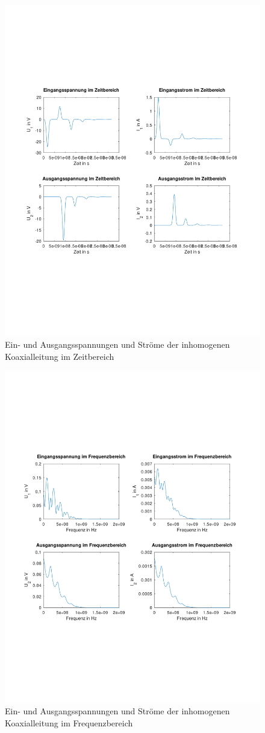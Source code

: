 \documentclass[Protokollheft.tex]{subfiles}
\begin{document}
\begin{figure}
	\centering
	\includegraphics[trim = 15mm 65mm 15mm 65mm, clip,width=0.7\linewidth]{inhomo_12}
	\caption{Ein- und Ausgangsspannungen  und Ströme der inhomogenen Koaxialleitung im Zeitbereich}
	\label{fig:inhomo_1}
\end{figure}
\begin{figure}
	\centering
	\includegraphics[trim = 15mm 65mm 15mm 65mm, clip,width=0.7\linewidth]{inhomo_2}
	\caption{Ein- und Ausgangsspannungen  und Ströme der inhomogenen Koaxialleitung im Frequenzbereich}
	\label{fig:inhomo_2}
\end{figure}
\end{document}
